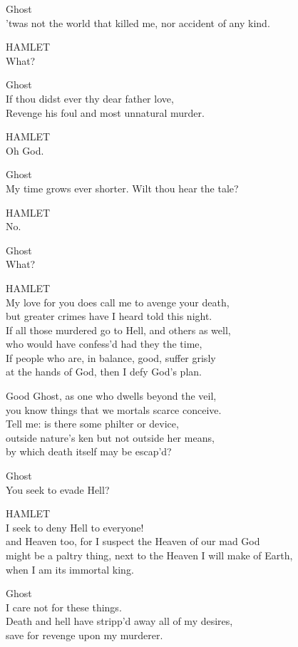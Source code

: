 Ghost\\'twas not the world that killed me, nor accident of any kind.

HAMLET\\What?

Ghost\\If thou didst ever thy dear father love,\\Revenge his foul and most unnatural murder.

HAMLET\\Oh God.

Ghost\\My time grows ever shorter. Wilt thou hear the tale?

HAMLET\\No.

Ghost\\What?

HAMLET\\My love for you does call me to avenge your death,\\but greater crimes have I heard told this night.\\If all those murdered go to Hell, and others as well,\\who would have confess'd had they the time,\\If people who are, in balance, good, suffer grisly\\at the hands of God, then I defy God's plan.

Good Ghost, as one who dwells beyond the veil,\\you know things that we mortals scarce conceive.\\Tell me: is there some philter or device,\\outside nature's ken but not outside her means,\\by which death itself may be escap'd?

Ghost\\You seek to evade Hell?

HAMLET\\I seek to deny Hell to everyone!\\and Heaven too, for I suspect the Heaven of our mad God\\might be a paltry thing, next to the Heaven I will make of Earth,\\when I am its immortal king.

Ghost\\I care not for these things.\\Death and hell have stripp'd away all of my desires,\\save for revenge upon my murderer.

